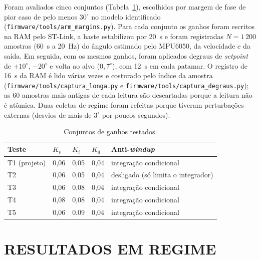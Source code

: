 Foram avaliados cinco conjuntos (Tabela~\ref{tab:refino_conj}), escolhidos por margem de fase de pior caso de pelo menos $30^\circ$ no modelo identificado (\texttt{firmware/tools/arm\_margins.py}). Para cada conjunto os ganhos foram escritos na RAM pelo ST-Link, a haste estabilizou por 20~s e foram registradas $N=1\,200$ amostras (60~s a 20~Hz) do ângulo estimado pelo MPU6050, da velocidade e da saída. Em seguida, com os mesmos ganhos, foram aplicados degraus de \textit{setpoint} de $+10^\circ$, $-20^\circ$ e volta ao alvo ($0{,}7^\circ$), com 12~s em cada patamar. O registro de 16~s da RAM é lido várias vezes e costurado pelo índice da amostra (\texttt{firmware/tools/captura\_longa.py} e \texttt{firmware/tools/captura\_degraus.py}); as 60 amostras mais antigas de cada leitura são descartadas porque a leitura não é atômica. Duas coletas de regime foram refeitas porque tiveram perturbações externas (desvios de mais de $3^\circ$ por poucos segundos).
\begin{table}[H]
\centering\caption{Conjuntos de ganhos testados.}\label{tab:refino_conj}
\begin{tabularx}{\textwidth}{llllX}
\hline\textbf{Teste} & $K_p$ & $K_i$ & $K_d$ & \textbf{Anti-\textit{windup}}\\\hline
T1 (projeto) & 0,06 & 0,05 & 0,04 & integração condicional\\
T2 & 0,06 & 0,05 & 0,04 & desligado (só limita o integrador)\\
T3 & 0,06 & 0,08 & 0,04 & integração condicional\\
T4 & 0,08 & 0,08 & 0,04 & integração condicional\\
T5 & 0,06 & 0,09 & 0,04 & integração condicional\\\hline
\end{tabularx}
\end{table}

\section{RESULTADOS EM REGIME}

